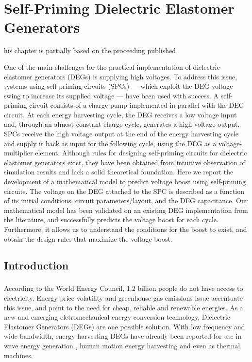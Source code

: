 


\let\textcircled=\pgftextcircled
\chapter{Self-Priming Dielectric Elastomer Generators}
\label{chap:2}

his chapter is partially based on the proceeding published 

One of the main challenges for the practical implementation of dielectric elastomer generators (DEGs) is supplying high voltages. To address this issue, systems using self-priming circuits (SPCs) --- which exploit the DEG voltage swing to increase its supplied voltage --- have been used with success. 
A self-priming circuit consists of a charge pump implemented in parallel with the DEG circuit. At each energy harvesting cycle, the DEG receives a low voltage input and, through an almost constant charge cycle, generates a high voltage output. SPCs receive the high voltage output at the end of the energy harvesting cycle and supply it back as input for the following cycle, using the DEG as a voltage-multiplier element.
 Although rules for designing self-priming circuits for dielectric elastomer generators exist, they have been obtained from intuitive observation of simulation results and lack a solid theoretical foundation.
Here we report the development of a mathematical model to predict voltage boost using self-priming circuits. The voltage on the DEG attached to the SPC is described as a function of its initial conditions, circuit parameters/layout, and the DEG capacitance. Our mathematical model has been validated on an existing DEG implementation from the literature, and successfully predicts the voltage boost for each cycle. Furthermore, it allows us to understand the conditions for the boost to exist, and obtain the design rules that maximize the voltage boost.

\section{Introduction}
\label{sect:intro}  %
\paragraph{} According to the World Energy Council\cite{EnergyIssues}, 1.2 billion people do not have access to electricity. Energy price volatility and greenhouse gas emissions issue accentuate this issue, and point to the need for cheap, reliable and renewable energies.  As a new and emerging eletromechanical energy conversion technology, Dielectric Elastomer Generators (DEGs) are one possible solution. With low frequency and wide bandwidth\cite{Boots2buoys}, energy harvesting DEGs have already been reported for use in wave energy generation \cite{VertechyPolyWECtest2014}, human motion energy harvesting\cite{MistralHMotion2008} and even as thermal machines\cite{Boots2buoys}.
